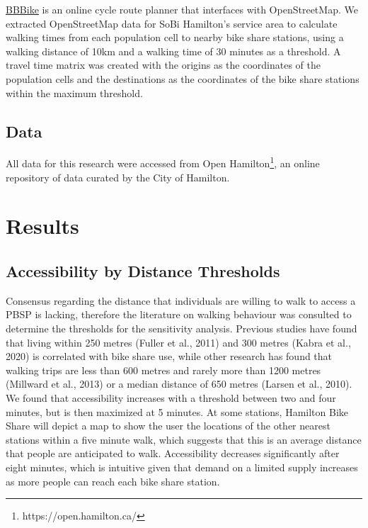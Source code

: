 \documentclass[]{elsarticle} %
\begin{document}
\href{https://download.bbbike.org/osm/bbbike/}{BBBike} is an online
cycle route planner that interfaces with OpenStreetMap. We extracted
OpenStreetMap data for SoBi Hamilton's service area to calculate walking
times from each population cell to nearby bike share stations, using a
walking distance of 10km and a walking time of 30 minutes as a
threshold. A travel time matrix was created with the origins as the
coordinates of the population cells and the destinations as the
coordinates of the bike share stations within the maximum threshold.

\hypertarget{data}{%
\subsection{Data}\label{data}}

All data for this research were accessed from Open Hamilton\footnote{https://open.hamilton.ca/},
an online repository of data curated by the City of Hamilton.

\hypertarget{results}{%
\section{Results}\label{results}}

\hypertarget{accessibility-by-distance-thresholds}{%
\subsection{Accessibility by Distance
Thresholds}\label{accessibility-by-distance-thresholds}}

Consensus regarding the distance that individuals are willing to walk to
access a PBSP is lacking, therefore the literature on walking behaviour
was consulted to determine the thresholds for the sensitivity analysis.
Previous studies have found that living within 250 metres (Fuller et
al., 2011) and 300 metres (Kabra et al., 2020) is correlated with bike
share use, while other research has found that walking trips are less
than 600 metres and rarely more than 1200 metres (Millward et al., 2013)
or a median distance of 650 metres (Larsen et al., 2010). We found that
accessibility increases with a threshold between two and four minutes,
but is then maximized at 5 minutes. At some stations, Hamilton Bike
Share will depict a map to show the user the locations of the other
nearest stations within a five minute walk, which suggests that this is
an average distance that people are anticipated to walk. Accessibility
decreases significantly after eight minutes, which is intuitive given
that demand on a limited supply increases as more people can reach each
bike share station.
\end{document}
